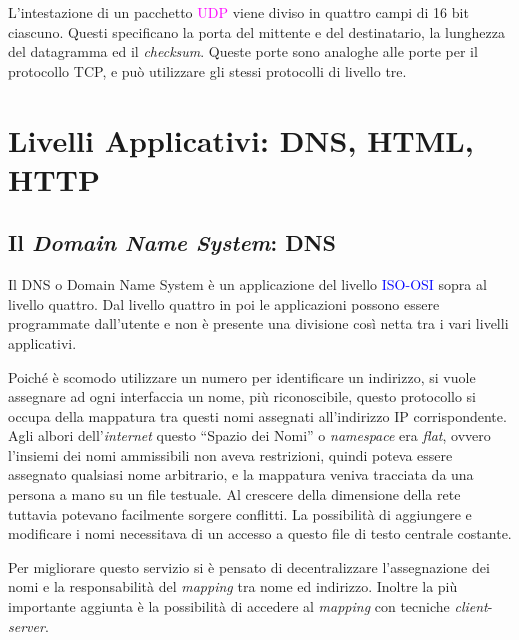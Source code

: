 \documentclass{article}
\numberwithin{equation}{subsection}
\begin{document}
L'intestazione di un pacchetto \textcolor{Fuchsia}{UDP} viene diviso in quattro campi di 16 bit ciascuno. Questi specificano la porta del mittente e del destinatario, la lunghezza del datagramma ed il \textit{checksum}. Queste porte sono analoghe alle porte per il protocollo \textcolor{Bittersweet}{TCP}, e può utilizzare gli stessi protocolli di livello tre. 


\clearpage

\section{Livelli Applicativi: \textcolor{Mahogany}{DNS}, \textcolor{Peach}{HTML}, \textcolor{NavyBlue}{HTTP}}

\subsection{Il \textit{Domain Name System}: \textcolor{Mahogany}{DNS}}

Il \textcolor{Mahogany}{DNS} o Domain Name System è un applicazione del livello \textcolor{blue}{ISO-OSI} sopra al livello quattro. Dal livello quattro in poi le applicazioni possono essere programmate dall'utente e non è presente una divisione così netta tra i vari livelli applicativi. 

Poiché è scomodo utilizzare un numero per identificare un indirizzo, si vuole assegnare ad ogni interfaccia un nome, più riconoscibile, questo protocollo si occupa della mappatura 
tra questi nomi assegnati all'indirizzo \textcolor{Bittersweet}{IP} corrispondente. 
Agli albori dell'\textit{internet} questo ``Spazio dei Nomi'' o \textit{namespace} era \textit{flat}, ovvero l'insiemi dei nomi ammissibili non aveva restrizioni, quindi poteva essere assegnato qualsiasi nome arbitrario, e la mappatura veniva tracciata da una 
persona a mano su un file testuale. Al crescere della dimensione della rete tuttavia potevano facilmente sorgere conflitti. La possibilità di aggiungere e modificare i nomi 
necessitava di un accesso a questo file di testo centrale costante. 

Per migliorare questo servizio si è pensato di decentralizzare l'assegnazione dei nomi e la responsabilità del \textit{mapping} tra nome ed indirizzo. Inoltre la più 
importante aggiunta è la possibilità di accedere al \textit{mapping} con tecniche \textit{client}-\textit{server}. 
\end{document}
